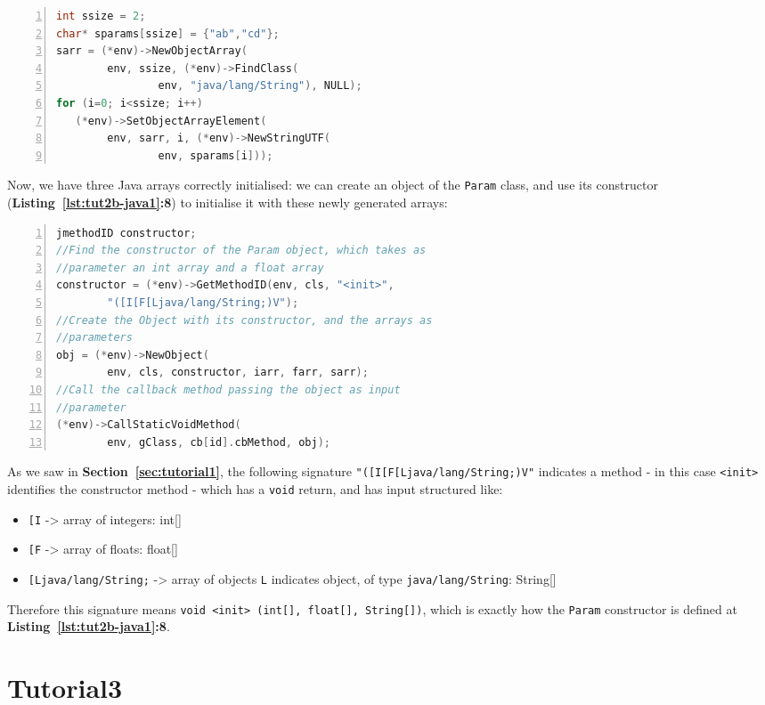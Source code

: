 \documentclass[a4paper,10pt]{article}
\newcommand{\keyword}[1]{\texttt{#1}}
\newcommand{\refl}[1]{\textbf{Listing~\ref{#1}}}
\newcommand{\refs}[1]{\textbf{Section~\ref{#1}}}
\begin{document}
\begin{multicols}{2}
\begin{lstlisting}[language=C,
		   columns=fullflexible,
		   showstringspaces=false,
		   xleftmargin=15pt,
		   frame = l,
		   numbers=left,
		   commentstyle=\color{gray}\upshape]
int ssize = 2;
char* sparams[ssize] = {"ab","cd"};
sarr = (*env)->NewObjectArray(
		env, ssize, (*env)->FindClass(
				env, "java/lang/String"), NULL);
for (i=0; i<ssize; i++)
   (*env)->SetObjectArrayElement(
   		env, sarr, i, (*env)->NewStringUTF(
   				env, sparams[i]));
\end{lstlisting}
Now, we have three Java arrays correctly initialised: we can create an object
of the \keyword{Param} class, and use its constructor
(\refl{lst:tut2b-java1}\textbf{:8}) to initialise it with these newly
generated arrays:
\begin{lstlisting}[language=C,
		   columns=fullflexible,
		   showstringspaces=false,
		   xleftmargin=15pt,
		   frame = l,
		   numbers=left,
		   commentstyle=\color{gray}\upshape]
jmethodID constructor;
//Find the constructor of the Param object, which takes as
//parameter an int array and a float array
constructor = (*env)->GetMethodID(env, cls, "<init>",
		"([I[F[Ljava/lang/String;)V");
//Create the Object with its constructor, and the arrays as
//parameters
obj = (*env)->NewObject(
		env, cls, constructor, iarr, farr, sarr);
//Call the callback method passing the object as input
//parameter
(*env)->CallStaticVoidMethod(
		env, gClass, cb[id].cbMethod, obj);
\end{lstlisting}
As we saw in \refs{sec:tutorial1}, the following signature
\keyword{"([I[F[Ljava/lang/String;)V"} indicates a method - in this case
\keyword{<init>} identifies the constructor method - which has a \keyword{void}
return, and has input structured like:
\begin{itemize}
\item \keyword{[I} -> array of integers: int[]
\item \keyword{[F} -> array of floats: float[]
\item \keyword{[Ljava/lang/String;} -> array of objects \keyword{L} indicates
object, of type \keyword{java/lang/String}: String[]
\end{itemize}
Therefore this signature means \keyword{void <init> (int[], float[], String[])},
which is exactly how the \keyword{Param} constructor is defined at
\refl{lst:tut2b-java1}\textbf{:8}.


\section{Tutorial3}


\end{multicols}
\end{document}
